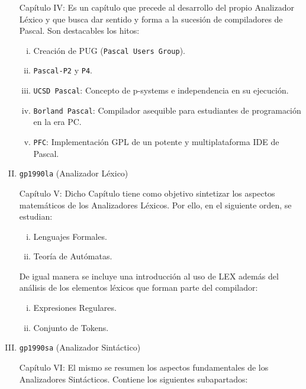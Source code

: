 \begin{enumerate}[I.]
{Capítulo IV: Es un capítulo que precede al desarrollo del propio Analizador 
Léxico y que busca dar sentido y forma a la sucesión de compiladores de Pascal. 
Son destacables los hitos:

\begin{enumerate}[i.]

\item Creación de PUG (\texttt{Pascal Users Group}). 

\item \texttt{Pascal-P2} y \texttt{P4}.

\item \texttt{UCSD Pascal}: Concepto de p-systems e independencia en su ejecución.

\item \texttt{Borland Pascal}: Compilador asequible para estudiantes de programación en 
la era PC.

\item \texttt{PFC}: Implementación GPL de un potente y multiplataforma IDE de Pascal.
\end{enumerate}

}
\item {{\tt gp1990la} (Analizador Léxico)}
{

Capítulo V: Dicho Capítulo tiene como objetivo sintetizar los aspectos matemáticos de los Analizadores Léxicos. Por ello, en el siguiente orden, se estudian:

\begin{enumerate}[i.]

\item Lenguajes Formales.

\item Teoría de Autómatas.
\end{enumerate}

De igual manera se incluye una introducción al uso de LEX además del análisis de los elementos léxicos que forman parte del compilador:

\begin{enumerate}[i.]

\item Expresiones Regulares.

\item Conjunto de Tokens.

\end{enumerate}

}
\item {{\tt gp1990sa} (Analizador Sintáctico)}
{

Capítulo VI: El mismo se resumen los aspectos fundamentales de los Analizadores Sintácticos. Contiene los siguientes subapartados:

}
\end{enumerate}
